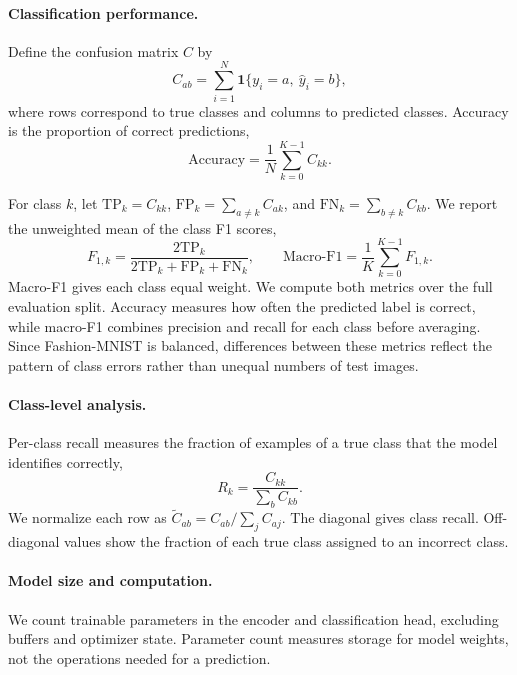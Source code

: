 \paragraph{Classification performance.}
Define the confusion matrix $C$ by
\begin{equation}
 C_{ab}=\sum_{i=1}^{N}\mathbf{1}\{y_i=a,\ \hat y_i=b\},
\end{equation}
where rows correspond to true classes and columns to predicted classes.
Accuracy is the proportion of correct predictions,
\begin{equation}
 \mathrm{Accuracy}=\frac{1}{N}\sum_{k=0}^{K-1}C_{kk}.
\end{equation}

For class $k$, let
$\mathrm{TP}_k=C_{kk}$,
$\mathrm{FP}_k=\sum_{a\ne k}C_{ak}$, and
$\mathrm{FN}_k=\sum_{b\ne k}C_{kb}$.
We report the unweighted mean of the class F1 scores,
\begin{equation}
 F_{1,k}=\frac{2\mathrm{TP}_k}
 {2\mathrm{TP}_k+\mathrm{FP}_k+\mathrm{FN}_k},
 \qquad
 \mathrm{Macro\text{-}F1}=\frac{1}{K}\sum_{k=0}^{K-1}F_{1,k}.
\end{equation}
Macro-F1 gives each class equal weight. We compute both metrics over the full
evaluation split. Accuracy measures how often the predicted label is correct,
while macro-F1 combines precision and recall for each class before averaging.
Since Fashion-MNIST is balanced, differences between these metrics reflect the
pattern of class errors rather than unequal numbers of test images.

\paragraph{Class-level analysis.}
Per-class recall measures the fraction of examples of a true class that the
model identifies correctly,
\begin{equation}
 R_k=\frac{C_{kk}}{\sum_b C_{kb}}.
\end{equation}
We normalize each row as $\widetilde C_{ab}=C_{ab}/\sum_j C_{aj}$.
The diagonal gives class recall. Off-diagonal values show the fraction of each
true class assigned to an incorrect class.

\paragraph{Model size and computation.}
We count trainable parameters in the encoder and classification head, excluding
buffers and optimizer state. Parameter count measures storage for model weights,
not the operations needed for a prediction.

